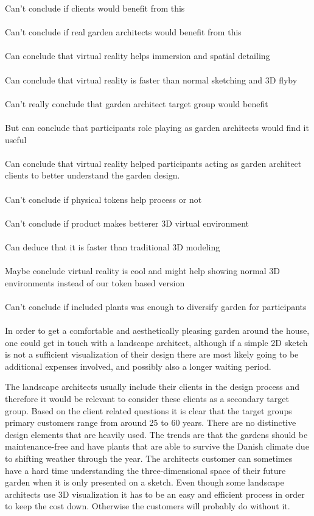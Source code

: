 Can't conclude if clients would benefit from this\\\\
Can't conclude if real garden architects would benefit from this\\\\
Can   conclude that virtual reality helps immersion and spatial detailing\\\\
Can conclude that virtual reality is faster than normal sketching and 3D flyby\\\\
Can't really conclude that garden architect target group would benefit\\\\
But can conclude that participants role playing as garden architects would find it useful\\\\
Can conclude that virtual reality helped participants acting as garden architect clients to better understand the garden design.\\\\
Can't conclude if physical tokens help process or not\\\\
Can't conclude if product makes betterer 3D virtual environment\\\\
Can deduce that it is faster than traditional 3D modeling\\\\
Maybe conclude virtual reality is cool and might help showing normal 3D environments instead of our token based version\\\\
Can't conclude if included plants was enough to diversify garden for participants\\\\




In order to get a comfortable and aesthetically pleasing garden around the house, one could get in touch with a landscape architect, although if a simple 2D sketch is not a sufficient visualization of their design there are most likely going to be additional expenses involved, and possibly also a longer waiting period.

The landscape architects usually include their clients in the design process and therefore it would be relevant to consider these clients as a secondary target group. Based on the client related questions it is clear that the target groups primary customers range from around 25 to 60 years. There are no distinctive design elements that are heavily used. The trends are that the gardens should be maintenance-free and have plants that are able to survive the Danish climate due to shifting weather through the year. The architects customer can sometimes have a hard time understanding the three-dimensional space of their future garden when it is only presented on a sketch. Even though some landscape architects use 3D visualization it has to be an easy and efficient process in order to keep the cost down. Otherwise the customers will probably do without it.

